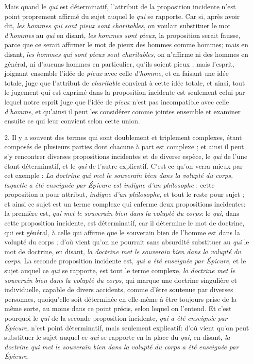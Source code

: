Mais quand le \emph{qui} est déterminatif, l'attribut de la proposition incidente n'est point proprement affirmé du sujet auquel le \emph{qui} se rapporte. Car si, après avoir dit, \emph{les hommes qui sont pieux sont charitables}, on voulait substituer le mot \emph{d'hommes} au \emph{qui} en disant, \emph{les hommes sont pieux}, la proposition serait fausse, parce que ce serait affirmer le mot de pieux des hommes comme hommes; mais en disant, \emph{les hommes qui sont pieux sont charitables}, on n'affirme ni des hommes en général, ni d'aucuns hommes en particulier, qu'ils soient pieux ; mais l'esprit, joignant ensemble l'idée de \emph{pieux} avec celle \emph{d'homme}, et en faisant une idée totale, juge que l'attribut de \emph{charitable} convient à cette idée totale, et ainsi, tout le jugement qui est exprimé dans la proposition incidente est seulement celui par lequel notre esprit juge que l'idée de \emph{pieux} n'est pas incompatible avec celle \emph{d'homme}, et qu'ainsi il peut les considérer comme jointes ensemble et examiner ensuite ce qui leur convient selon cette union.

\bigbreak
{2.} Il y a souvent des termes qui sont doublement et triplement complexes, étant composés de plusieurs parties dont chacune à part est complexe ; et ainsi il peut s'y rencontrer diverses propositions incidentes et de diverse espèce, le \emph{qui} de l'une étant déterminatif, et le \emph{qui} de l'autre explicatif. C'est ce qu'on verra mieux par cet exemple : \emph{La doctrine qui met le souverain bien dans la volupté du corps, laquelle a été enseignée par Épicure est indigne d'un philosophe} : cette proposition a pour attribut, \emph{indigne d'un philosophe}, et tout le reste pour sujet ; et ainsi ce sujet est un terme complexe qui enferme deux propositions incidentes: la première est, \emph{qui met le souverain bien dans la volupté du corps}: le \emph{qui}, dans cette proposition incidente, est déterminatif, car il détermine le mot de doctrine, qui est général, à celle qui affirme que le souverain bien de l'homme est dans la volupté du corps ; d'où vient qu'on ne pourrait sans absurdité substituer au \emph{qui} le mot de doctrine, en disant, \emph{la doctrine met le souverain bien dans la volupté du corps}. La seconde proposition incidente est, \emph{qui a été enseignée par Épicure}, et le sujet auquel ce \emph{qui} se rapporte, est tout le terme complexe, \emph{la doctrine met le souverain bien dans la volupté du corps}, qui marque une doctrine singulière et individuelle, capable de divers accidents, comme d'être soutenue par diverses personnes, quoiqu'elle soit déterminée en elle-même à être toujours prise de la même sorte, au moins dans ce point précis, selon lequel on l'entend. Et c'est pourquoi le \emph{qui} de la seconde proposition incidente, \emph{qui a été enseignée par Épicure}, n'est point déterminatif, mais seulement explicatif: d'où vient qu'on peut substituer le sujet auquel ce \emph{qui} se rapporte en la place du \emph{qui}, en disant, \emph{la doctrine qui met le souverain bien dans la volupté du corps a été enseignée par Épicure}.

